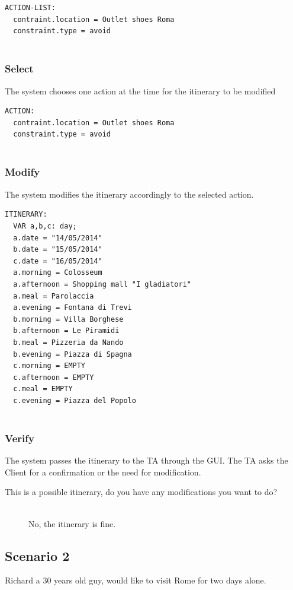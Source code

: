 \documentclass[11pt]{article} %
\begin{document}
\begin{lstlisting}[breaklines=true,mathescape=true]
ACTION-LIST:
  contraint.location = Outlet shoes Roma
  constraint.type = avoid
  
\end{lstlisting}

\subsubsection{Select}
The system chooses one action at the time for the itinerary to be modified

\begin{lstlisting}[breaklines=true,mathescape=true]
ACTION:
  contraint.location = Outlet shoes Roma
  constraint.type = avoid
  
\end{lstlisting}

\subsubsection{Modify}
The system modifies the itinerary accordingly to the selected action.

\begin{lstlisting}[breaklines=true,mathescape=true]
ITINERARY:
  VAR a,b,c: day;
  a.date = "14/05/2014"
  b.date = "15/05/2014"
  c.date = "16/05/2014"
  a.morning = Colosseum
  a.afternoon = Shopping mall "I gladiatori"
  a.meal = Parolaccia
  a.evening = Fontana di Trevi
  b.morning = Villa Borghese
  b.afternoon = Le Piramidi
  b.meal = Pizzeria da Nando
  b.evening = Piazza di Spagna
  c.morning = EMPTY
  c.afternoon = EMPTY 
  c.meal = EMPTY
  c.evening = Piazza del Popolo
  
\end{lstlisting}

\subsubsection{Verify}
The system passes the itinerary to the TA through the GUI. The TA asks the Client for a confirmation or the need for modification.

\begin{description}
  \item[This is a possible itinerary, do you have any modifications you want to do?] \hfill \\
  No, the itinerary is fine.
\end{description}

\subsection{Scenario 2}
Richard a 30 years old guy, would like to visit Rome for two days alone.
\end{document}

